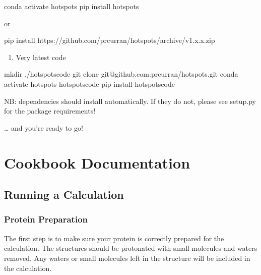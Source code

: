 \documentclass[letterpaper,10pt,english]{sphinxmanual}
\begin{document}
\begin{sphinxVerbatim}[commandchars=\\\{\}]
conda activate hotspots
pip install hotspots
\end{sphinxVerbatim}

or

\begin{sphinxVerbatim}[commandchars=\\\{\}]
pip install https://github.com/prcurran/hotspots/archive/v1.x.x.zip
\end{sphinxVerbatim}
\begin{enumerate}
%
\setcounter{enumi}{1}
\item {} 
Very latest code

\end{enumerate}

\begin{sphinxVerbatim}[commandchars=\\\{\}]
mkdir ./hotspots\PYGZus{}code
git clone git@github.com:prcurran/hotspots.git
conda activate hotspots
 hotspots\PYGZus{}code
pip install hotspots\PYGZus{}code
\end{sphinxVerbatim}

NB: dependencies should install automatically. If they do not, please see setup.py for the package requirements!

… and you’re ready to go!


\chapter{Cookbook Documentation}
\label{\detokenize{tutorial:cookbook-documentation}}

\section{Running a Calculation}
\label{\detokenize{tutorial:running-a-calculation}}

\subsection{Protein Preparation}
\label{\detokenize{tutorial:protein-preparation}}
The first step is to make sure your protein is correctly prepared for the calculation. The structures should be
protonated with small molecules and waters removed. Any waters or small molecules left in the structure will be included
in the calculation.
\end{document}
